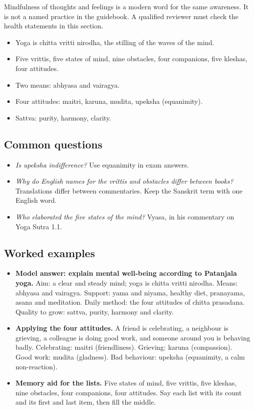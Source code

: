 \begin{caution}
Mindfulness of thoughts and feelings is a modern word for the same awareness. It is not a named practice in the guidebook. A qualified reviewer must check the health statements in this section.
\end{caution}

\begin{recall}
\begin{itemize}
\item Yoga is chitta vritti nirodha, the stilling of the waves of the mind.
\item Five vrittis, five states of mind, nine obstacles, four companions, five kleshas, four attitudes.
\item Two means: abhyasa and vairagya.
\item Four attitudes: maitri, karuna, mudita, upeksha (equanimity).
\item Sattva: purity, harmony, clarity.
\end{itemize}
\end{recall}

\subsection*{Common questions}
\begin{itemize}
\item \emph{Is upeksha indifference?} Use equanimity in exam answers.
\item \emph{Why do English names for the vrittis and obstacles differ between books?} Translations differ between commentaries. Keep the Sanskrit term with one English word.
\item \emph{Who elaborated the five states of the mind?} Vyasa, in his commentary on Yoga Sutra 1.1.
\end{itemize}

\subsection*{Worked examples}
\begin{itemize}
\item \textbf{Model answer: explain mental well-being according to Patanjala yoga.} Aim: a clear and steady mind; yoga is chitta vritti nirodha. Means: abhyasa and vairagya. Support: yama and niyama, healthy diet, pranayama, asana and meditation. Daily method: the four attitudes of chitta prasadana. Quality to grow: sattva, purity, harmony and clarity.
\item \textbf{Applying the four attitudes.} A friend is celebrating, a neighbour is grieving, a colleague is doing good work, and someone around you is behaving badly. Celebrating: maitri (friendliness). Grieving: karuna (compassion). Good work: mudita (gladness). Bad behaviour: upeksha (equanimity, a calm non-reaction).
\item \textbf{Memory aid for the lists.} Five states of mind, five vrittis, five kleshas, nine obstacles, four companions, four attitudes. Say each list with its count and its first and last item, then fill the middle.
\end{itemize}

